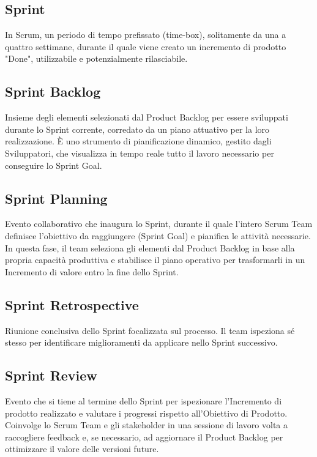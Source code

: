 \documentclass[a4paper, 11pt, oneside]{scrartcl} %
\begin{document}
\subsection*{Sprint}
In Scrum, un periodo di tempo prefissato (time-box), solitamente da una a quattro settimane, durante il quale viene creato un incremento di prodotto "Done", utilizzabile e potenzialmente rilasciabile.
\vspace{0.5cm}

\subsection*{Sprint Backlog}
Insieme degli elementi selezionati dal Product Backlog per essere sviluppati durante lo Sprint corrente, corredato da un piano attuativo per la loro realizzazione. È uno strumento di pianificazione dinamico, gestito dagli Sviluppatori, che visualizza in tempo reale tutto il lavoro necessario per conseguire lo Sprint Goal.
\vspace{0.5cm}

\subsection*{Sprint Planning}
Evento collaborativo che inaugura lo Sprint, durante il quale l'intero Scrum Team definisce l'obiettivo da raggiungere (Sprint Goal) e pianifica le attività necessarie. In questa fase, il team seleziona gli elementi dal Product Backlog in base alla propria capacità produttiva e stabilisce il piano operativo per trasformarli in un Incremento di valore entro la fine dello Sprint.
\vspace{0.5cm}

\subsection*{Sprint Retrospective}
Riunione conclusiva dello Sprint focalizzata sul processo. Il team ispeziona sé stesso per identificare miglioramenti da applicare nello Sprint successivo.
\vspace{0.5cm}

\subsection*{Sprint Review}
Evento che si tiene al termine dello Sprint per ispezionare l'Incremento di prodotto realizzato e valutare i progressi rispetto all'Obiettivo di Prodotto. Coinvolge lo Scrum Team e gli stakeholder in una sessione di lavoro volta a raccogliere feedback e, se necessario, ad aggiornare il Product Backlog per ottimizzare il valore delle versioni future.
\vspace{0.5cm}
\end{document}
